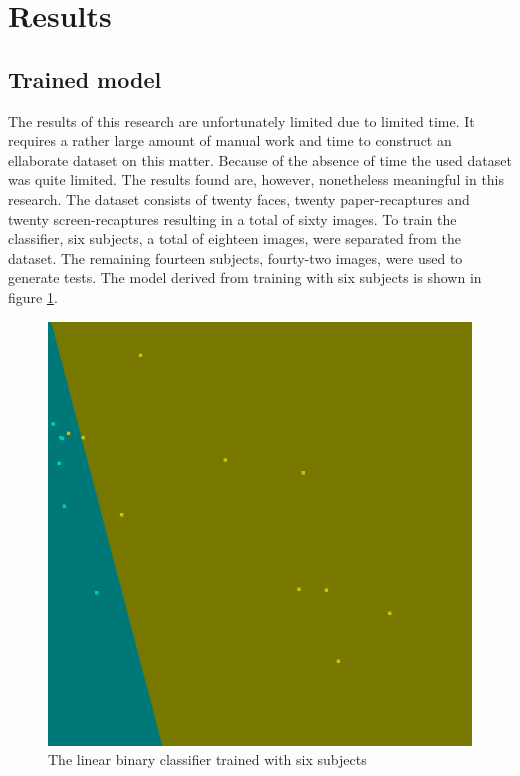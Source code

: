 \documentclass{sig-alternate-br}
\begin{document}
\section{Results} \label{results}

\subsection{Trained model} \label{model}
The results of this research are unfortunately limited due to limited time. It requires a rather large amount of manual work and time to construct an ellaborate dataset on this matter. Because of the absence of time the used dataset was quite limited. The results found are, however, nonetheless meaningful in this research. The dataset consists of twenty faces, twenty paper-recaptures and twenty screen-recaptures resulting in a total of sixty images. To train the classifier, six subjects, a total of eighteen images, were separated from the dataset. The remaining fourteen subjects, fourty-two images, were used to generate tests. The model derived from training with six subjects is shown in figure \ref{fig:model}.

\begin{figure}[h]
	\includegraphics[scale=0.2]{model}
	\caption{The linear binary classifier trained with six subjects}
	\label{fig:model}
\end{figure}
\end{document}
